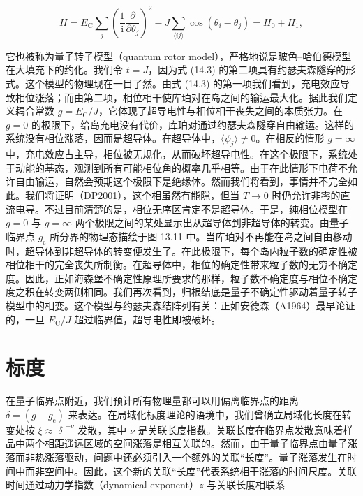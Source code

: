 \begin{equation*}
H = E_{\mathrm{C}} \sum_j \left( \frac{1}{\mathrm{i}} \frac{\partial}{\partial \theta_j} \right)^2 - J \sum_{\langle ij\rangle} \cos(\theta_i - \theta_j) = H_0 + H_1,\tag{14.3}
\end{equation*}

它也被称为量子转子模型（quantum rotor model），严格地说是玻色–哈伯德模型在大填充下的约化。我们令 $t=J$，因为式 (14.3) 的第二项具有约瑟夫森隧穿的形式。这个模型的物理现在一目了然。由式 (14.3) 的第一项我们看到，充电效应导致相位涨落；而由第二项，相位相干使库珀对在岛之间的输运最大化。据此我们定义耦合常数 $g=E_{\mathrm{C}}/J$，它体现了超导电性与相位相干丧失之间的本质张力。在 $g=0$ 的极限下，给岛充电没有代价，库珀对通过约瑟夫森隧穿自由输运。这样的系统没有相位涨落，因而是超导体。在超导体中，$\langle\psi_j\rangle\neq 0$。在相反的情形 $g=\infty$ 中，充电效应占主导，相位被无规化，从而破坏超导电性。在这个极限下，系统处于动能的基态，观测到所有可能相位角的概率几乎相等。由于在此情形下电荷不允许自由输运，自然会预期这个极限下是绝缘体。然而我们将看到，事情并不完全如此。我们将证明（DP2001），这个相虽然有能隙，但当 $T\rightarrow 0$ 时仍允许非零的直流电导。不过目前清楚的是，相位无序区肯定不是超导体。于是，纯相位模型在 $g=0$ 与 $g=\infty$ 两个极限之间的某处显示出从超导体到非超导体的转变。由量子临界点 $g_{\mathrm{c}}$ 所分界的物理态描绘于图 13.11 中。当库珀对不再能在岛之间自由移动时，超导体到非超导体的转变便发生了。在此极限下，每个岛内粒子数的确定性被相位相干的完全丧失所制衡。在超导体中，相位的确定性带来粒子数的无穷不确定度。因此，正如海森堡不确定性原理所要求的那样，粒子数不确定度与相位不确定度之积在转变两侧相同。我们再次看到，归根结底是量子不确定性驱动着量子转子模型中的相变。这个模型与约瑟夫森结阵列有关：正如安德森（A1964）最早论证的，一旦 $E_{\mathrm{C}}/J$ 超过临界值，超导电性即被破坏。

\section{标度}

在量子临界点附近，我们预计所有物理量都可以用偏离临界点的距离 $\delta=(g-g_{\mathrm{c}})$ 来表达。在局域化标度理论的语境中，我们曾确立局域化长度在转变处按 $\xi\approx|\delta|^{-\nu}$ 发散，其中 $\nu$ 是关联长度指数。关联长度在临界点发散意味着样品中两个相距遥远区域的空间涨落是相互关联的。然而，由于量子临界点由量子涨落而非热涨落驱动，问题中还必须引入一个额外的关联“长度”。量子涨落发生在时间中而非空间中。因此，这个新的关联“长度”代表系统相干涨落的时间尺度。关联时间通过动力学指数（dynamical exponent）$z$ 与关联长度相联系

